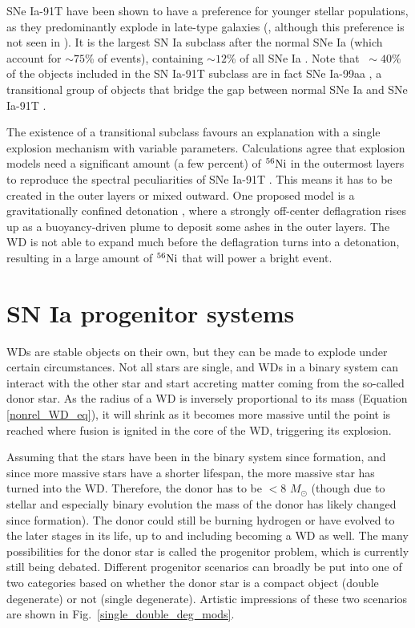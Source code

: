 \documentclass[a4paper,oneside,12pt, class=Latex/Classes/PhDthesisPSnPDF, crop=false]{standalone}
\begin{document}
SNe Ia-91T have been shown to have a preference for younger stellar populations, as they predominantly explode in late-type galaxies (\citealt{Filippenko_91t, 91T}, although this preference is not seen in \citealt{DR2_diversity}). It is the largest SN Ia subclass after the normal SNe Ia (which account for $\sim75$\% of events), containing $\sim12$\% of all SNe Ia \citep{DR2_diversity}. Note that $~\sim40$\% of the objects included in the SN Ia-91T subclass are in fact SNe Ia-99aa \citep{DR2_diversity}, a transitional group of objects that bridge the gap between normal SNe Ia and SNe Ia-91T \citep{Taubenberger_plot}. 

The existence of a transitional subclass favours an explanation with a single explosion mechanism with variable parameters. Calculations agree that explosion models need a significant amount (a few percent) of $^{56}\text{Ni}$ in the outermost layers to reproduce the spectral peculiarities of SNe Ia-91T \citep[see e.g.][]{91T_modelling}. This means it has to be created in the outer layers or mixed outward. One proposed model is a gravitationally confined detonation \citep{91T_GCD_model}, where a strongly off-center deflagration rises up as a buoyancy-driven plume to deposit some ashes in the outer layers. The WD is not able to expand much before the deflagration turns into a detonation, resulting in a large amount of $^{56}\text{Ni}$ that will power a bright event.


\section{SN Ia progenitor systems}
\label{Ia_progenitors}
WDs are stable objects on their own, but they can be made to explode under certain circumstances. Not all stars are single, and WDs in a binary system can interact with the other star and start accreting matter coming from the so-called donor star. As the radius of a WD is inversely proportional to its mass (Equation \ref{nonrel_WD_eq}), it will shrink as it becomes more massive until the point is reached where fusion is ignited in the core of the WD, triggering its explosion.

Assuming that the stars have been in the binary system since formation, and since more massive stars have a shorter lifespan, the more massive star has turned into the WD. Therefore, the donor has to be $<8$ $M_\odot$ (though due to stellar and especially binary evolution the mass of the donor has likely changed since formation). The donor could still be burning hydrogen or have evolved to the later stages in its life, up to and including becoming a WD as well. The many possibilities for the donor star is called the progenitor problem, which is currently still being debated. Different progenitor scenarios can broadly be put into one of two categories based on whether the donor star is a compact object (double degenerate) or not (single degenerate). Artistic impressions of these two scenarios are shown in Fig.~\ref{single_double_deg_mods}.
\end{document}
